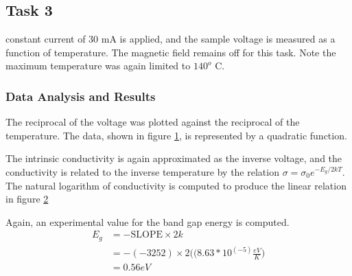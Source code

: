 \documentclass[a4paper]{article}
\begin{document}
\subsection{Task 3}
 constant current of 30 mA is applied, and the sample voltage is
measured as a function of temperature. The magnetic field
remains off for this task. Note the maximum temperature was again limited to $140^o$ C.

\subsubsection{Data Analysis and Results}
The reciprocal of the voltage was plotted against the 
reciprocal of the temperature. The data, shown in figure \ref{task33plot}, is represented by a quadratic function.

\begin{figure}[H]
\centering
\label{task33plot}
\end{figure}

The intrinsic conductivity is again approximated as the inverse voltage, and the conductivity is related to the inverse temperature by the relation $\sigma = \sigma_0 e^{-E_g/2kT}$. The natural logarithm of conductivity is computed to produce the linear relation in figure \ref{task33plotLINEAR}

\begin{figure}[H]
\centering
\label{task33plotLINEAR}
\end{figure}

Again, an experimental value for the band gap energy is computed.
\begin{align*}
E_g &= - \text{SLOPE} \times 2k \\
    &= - (-3252) \times 2 
       \Big( (8.63 *10^(-5) \frac{eV}{K} \Big) \\
    &= 0.56 eV \\
\end{align*}
\end{document}

